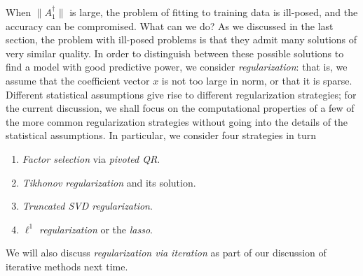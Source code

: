 \documentclass[12pt, leqno]{article} %
\begin{document}
When $\|A_1^\dagger\|$ is large, the problem of fitting to training
data is ill-posed, and the accuracy can be compromised.  What can we
do?  As we discussed in the last section, the problem with ill-posed
problems is that they admit many solutions of very similar quality.
In order to distinguish between these possible solutions to find a
model with good predictive power, we consider {\em regularization}:
that is, we assume that the coefficient vector $x$ is not too large
in norm, or that it is sparse.  Different statistical assumptions give
rise to different regularization strategies; for the current
discussion, we shall focus on the computational properties
of a few of the more common regularization strategies without going
into the details of the statistical assumptions.  In particular,
we consider four strategies in turn
\begin{enumerate}
\item {\em Factor selection} via {\em pivoted QR}.
\item {\em Tikhonov regularization} and its solution.
\item {\em Truncated SVD regularization}.
\item {\em $\ell^1$ regularization} or the {\em lasso}.
\end{enumerate}
We will also discuss {\em regularization via iteration} as part
of our discussion of iterative methods next time.
\end{document}
